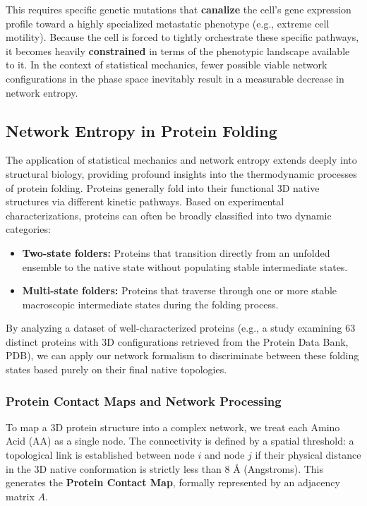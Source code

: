 This requires specific genetic mutations that \textbf{canalize} the cell's gene expression profile toward a highly specialized metastatic phenotype (e.g., extreme cell motility). Because the cell is forced to tightly orchestrate these specific pathways, it becomes heavily \textbf{constrained} in terms of the phenotypic landscape available to it. In the context of statistical mechanics, fewer possible viable network configurations in the phase space inevitably result in a measurable decrease in network entropy.

\subsection{Network Entropy in Protein Folding}
\label{subsec:protein_folding_entropy}

The application of statistical mechanics and network entropy extends deeply into structural biology, providing profound insights into the thermodynamic processes of protein folding. Proteins generally fold into their functional 3D native structures via different kinetic pathways. Based on experimental characterizations, proteins can often be broadly classified into two dynamic categories:
\begin{itemize}
    \item \textbf{Two-state folders:} Proteins that transition directly from an unfolded ensemble to the native state without populating stable intermediate states.
    \item \textbf{Multi-state folders:} Proteins that traverse through one or more stable macroscopic intermediate states during the folding process.
\end{itemize}

By analyzing a dataset of well-characterized proteins (e.g., a study examining 63 distinct proteins with 3D configurations retrieved from the Protein Data Bank, PDB), we can apply our network formalism to discriminate between these folding states based purely on their final native topologies.

\subsubsection{Protein Contact Maps and Network Processing}
\label{subsubsec:protein_contact_maps}

To map a 3D protein structure into a complex network, we treat each Amino Acid (AA) as a single node. The connectivity is defined by a spatial threshold: a topological link is established between node \(i\) and node \(j\) if their physical distance in the 3D native conformation is strictly less than \(8 \text{ \AA}\) (Angstroms). This generates the \textbf{Protein Contact Map}, formally represented by an adjacency matrix \(A\).

